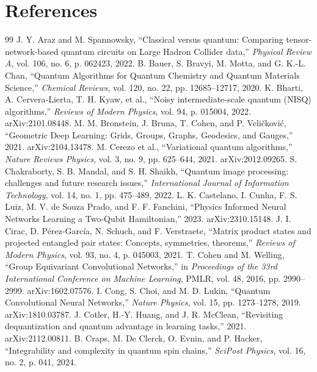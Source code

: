 \documentclass[11pt]{article}
\begin{document}
\part{References}
\begin{thebibliography}{99}
 J. Y. Araz and M. Spannowsky, ``Classical versus quantum: Comparing tensor-network-based quantum circuits on Large Hadron Collider data,'' \textit{Physical Review A}, vol. 106, no. 6, p. 062423, 2022.
 B. Bauer, S. Bravyi, M. Motta, and G. K.-L. Chan, ``Quantum Algorithms for Quantum Chemistry and Quantum Materials Science,'' \textit{Chemical Reviews}, vol. 120, no. 22, pp. 12685--12717, 2020.
 K. Bharti, A. Cervera-Lierta, T. H. Kyaw, et al., ``Noisy intermediate-scale quantum (NISQ) algorithms,'' \textit{Reviews of Modern Physics}, vol. 94, p. 015004, 2022. arXiv:2101.08448.
 M. M. Bronstein, J. Bruna, T. Cohen, and P. Veli\v{c}kovi\'c, ``Geometric Deep Learning: Grids, Groups, Graphs, Geodesics, and Gauges,'' 2021. arXiv:2104.13478.
 M. Cerezo et al., ``Variational quantum algorithms,'' \textit{Nature Reviews Physics}, vol. 3, no. 9, pp. 625--644, 2021. arXiv:2012.09265.
 S. Chakraborty, S. B. Mandal, and S. H. Shaikh, ``Quantum image processing: challenges and future research issues,'' \textit{International Journal of Information Technology}, vol. 14, no. 1, pp. 475--489, 2022.
 L. K. Castelano, I. Cunha, F. S. Luiz, M. V. de Souza Prado, and F. F. Fanchini, ``Physics Informed Neural Networks Learning a Two-Qubit Hamiltonian,'' 2023. arXiv:2310.15148.
 J. I. Cirac, D. P\'erez-Garc\'ia, N. Schuch, and F. Verstraete, ``Matrix product states and projected entangled pair states: Concepts, symmetries, theorems,'' \textit{Reviews of Modern Physics}, vol. 93, no. 4, p. 045003, 2021.
 T. Cohen and M. Welling, ``Group Equivariant Convolutional Networks,'' in \textit{Proceedings of the 33rd International Conference on Machine Learning}, PMLR, vol. 48, 2016, pp. 2990--2999. arXiv:1602.07576.
 I. Cong, S. Choi, and M. D. Lukin, ``Quantum Convolutional Neural Networks,'' \textit{Nature Physics}, vol. 15, pp. 1273--1278, 2019. arXiv:1810.03787.
 J. Cotler, H.-Y. Huang, and J. R. McClean, ``Revisiting dequantization and quantum advantage in learning tasks,'' 2021. arXiv:2112.00811.
 B. Craps, M. De Clerck, O. Evnin, and P. Hacker, ``Integrability and complexity in quantum spin chains,'' \textit{SciPost Physics}, vol. 16, no. 2, p. 041, 2024.

\end{thebibliography}
\end{document}
